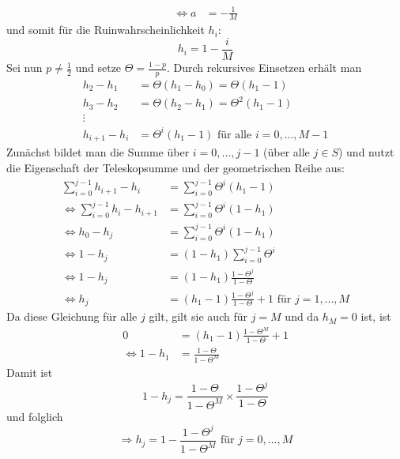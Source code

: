 \documentclass[a4paper,12pt]{article}
\begin{document}
\begin{tcolorbox}[breakable, colframe=blue, colback=white, title=Beispiel 9]
\begin{align*}
		\Leftrightarrow a & = - \frac{1}{M}
	\end{align*}
	und somit für die Ruinwahrscheinlichkeit $h_i$:
	$$
		h_i = 1 - \frac{i}{M}
	$$
	Sei nun $p \neq \frac{1}{2}$ und setze $\Theta = \frac{1-p}{p}$. Durch rekursives Einsetzen erhält man
	\begin{align*}
		h_2 - h_1     & = \Theta (h_1 - h_0) = \Theta (h_1 - 1)                 \\
		h_3 - h_2     & = \Theta (h_2 - h_1) = \Theta^2 (h_1 - 1)               \\
		\vdots        &                                                         \\
		h_{i+1} - h_i & = \Theta^{i}(h_1 - 1) \text{ für alle } i = 0, ..., M-1
	\end{align*}
	Zunächst bildet man die Summe über $i=0, ..., j-1$ (über alle $j \in S$) und nutzt die Eigenschaft der Teleskopsumme und der geometrischen Reihe aus:
	\begin{align*}
		\sum_{i=0}^{j-1} h_{i+1} - h_i                & = \sum_{i=0}^{j-1}\Theta^{i}(h_1 - 1)                                      \\
		\Leftrightarrow\sum_{i=0}^{j-1} h_i - h_{i+1} & = \sum_{i=0}^{j-1}\Theta^{i}(1 - h_1)                                      \\
		\Leftrightarrow   h_0 - h_{j}                 & =  \sum_{i=0}^{j-1}\Theta^{i}(1 - h_1)                                     \\
		\Leftrightarrow 1 - h_{j}                     & =  (1 - h_1)\sum_{i=0}^{j-1}\Theta^{i}                                     \\
		\Leftrightarrow 1 - h_{j}                     & =  (1 - h_1)\frac{1-\Theta^{j}}{1- \Theta}                                 \\
		\Leftrightarrow h_{j}                         & =  ( h_1 - 1)\frac{1-\Theta^{j}}{1- \Theta} +1  \text{ für } j = 1, ..., M
	\end{align*}
	Da diese Gleichung für alle $j$ gilt, gilt sie auch für $j=M$ und da $h_M = 0$ ist, ist
	\begin{align*}
		0                      & = ( h_1 - 1)\frac{1-\Theta^{M}}{1- \Theta} +1 \\
		\Leftrightarrow 1- h_1 & = \frac{1- \Theta}{1- \Theta^M}
	\end{align*}
	Damit ist
	$$
		1 - h_j = \frac{1- \Theta}{1- \Theta^M} \times \frac{1- \Theta^j}{1- \Theta}
	$$
	und  folglich
	$$
		\Rightarrow h_j = 1 - \frac{1 - \Theta^{j}}{1-\Theta^{M}} \text{ für } j = 0, ..., M
	$$
\end{tcolorbox}
\end{document}
